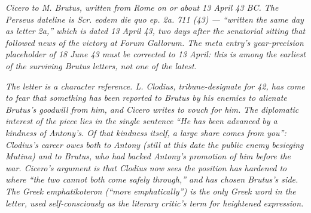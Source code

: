 
\textit{Cicero to M. Brutus, written from Rome on or
about 13 April 43 BC. The Perseus dateline is
\textit{Scr. eodem die quo ep. 2a. 711 (43)} --- ``written
the same day as letter 2a,'' which is dated 13 April 43,
two days after the senatorial sitting that followed news
of the victory at Forum Gallorum. The meta entry's
year-precision placeholder of 18 June 43 must be
corrected to 13 April: this is among the earliest of
the surviving Brutus letters, not one of the latest.}

\textit{The letter is a character reference. L. Clodius,
tribune-designate for 42, has come to fear that something
has been reported to Brutus by his enemies to alienate
Brutus's goodwill from him, and Cicero writes to vouch for
him. The diplomatic interest of the piece lies in the
single sentence ``He has been advanced by a kindness of
Antony's. Of that kindness itself, a large share comes
from you'': Clodius's career owes both to Antony (still
at this date the public enemy besieging Mutina) and to
Brutus, who had backed Antony's promotion of him before
the war. Cicero's argument is that Clodius now sees the
position has hardened to where ``the two cannot both come
safely through,'' and has chosen Brutus's side. The Greek
\textit{emphatikoteron} (``more emphatically'') is the
only Greek word in the letter, used self-consciously as
the literary critic's term for heightened expression.}
